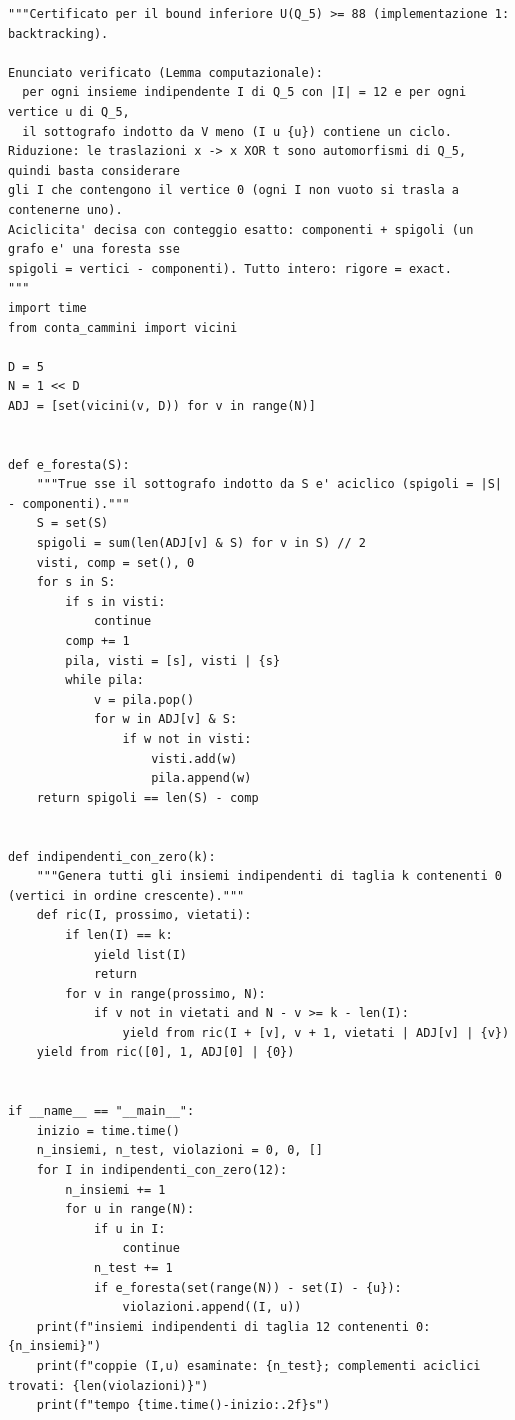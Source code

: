 \documentclass[11pt,a4paper]{article}
\begin{document}
\begin{lstlisting}[caption={certificati/verifica\_q5\_indipendenti.py}]
"""Certificato per il bound inferiore U(Q_5) >= 88 (implementazione 1: backtracking).

Enunciato verificato (Lemma computazionale):
  per ogni insieme indipendente I di Q_5 con |I| = 12 e per ogni vertice u di Q_5,
  il sottografo indotto da V meno (I u {u}) contiene un ciclo.
Riduzione: le traslazioni x -> x XOR t sono automorfismi di Q_5, quindi basta considerare
gli I che contengono il vertice 0 (ogni I non vuoto si trasla a contenerne uno).
Aciclicita' decisa con conteggio esatto: componenti + spigoli (un grafo e' una foresta sse
spigoli = vertici - componenti). Tutto intero: rigore = exact.
"""
import time
from conta_cammini import vicini

D = 5
N = 1 << D
ADJ = [set(vicini(v, D)) for v in range(N)]


def e_foresta(S):
    """True sse il sottografo indotto da S e' aciclico (spigoli = |S| - componenti)."""
    S = set(S)
    spigoli = sum(len(ADJ[v] & S) for v in S) // 2
    visti, comp = set(), 0
    for s in S:
        if s in visti:
            continue
        comp += 1
        pila, visti = [s], visti | {s}
        while pila:
            v = pila.pop()
            for w in ADJ[v] & S:
                if w not in visti:
                    visti.add(w)
                    pila.append(w)
    return spigoli == len(S) - comp


def indipendenti_con_zero(k):
    """Genera tutti gli insiemi indipendenti di taglia k contenenti 0 (vertici in ordine crescente)."""
    def ric(I, prossimo, vietati):
        if len(I) == k:
            yield list(I)
            return
        for v in range(prossimo, N):
            if v not in vietati and N - v >= k - len(I):
                yield from ric(I + [v], v + 1, vietati | ADJ[v] | {v})
    yield from ric([0], 1, ADJ[0] | {0})


if __name__ == "__main__":
    inizio = time.time()
    n_insiemi, n_test, violazioni = 0, 0, []
    for I in indipendenti_con_zero(12):
        n_insiemi += 1
        for u in range(N):
            if u in I:
                continue
            n_test += 1
            if e_foresta(set(range(N)) - set(I) - {u}):
                violazioni.append((I, u))
    print(f"insiemi indipendenti di taglia 12 contenenti 0: {n_insiemi}")
    print(f"coppie (I,u) esaminate: {n_test}; complementi aciclici trovati: {len(violazioni)}")
    print(f"tempo {time.time()-inizio:.2f}s")

\end{lstlisting}
\end{document}
